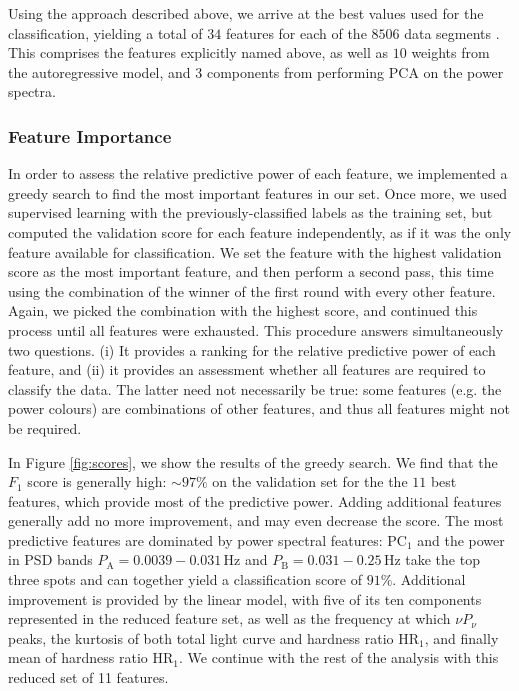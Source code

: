 \documentclass[12pt]{emulateapj}
\begin{document}
Using the approach described above, we arrive at the best values used for the classification, yielding a total of $34$ features for each of the $8506$ data segments . This comprises the features explicitly named above, as well as $10$ weights from the autoregressive model, and $3$ components from performing PCA on the power spectra.

\subsubsection{Feature Importance}

In order to assess the relative predictive power of each feature, we implemented a greedy search to find the most important features in our set. 
Once more, we used supervised learning with the previously-classified labels as the training set, but computed the validation score for each feature independently, as if it was the only feature available for classification. We set the feature with the highest validation score as the most important feature, and then perform a second pass, this time using the combination of the winner of the first round with every other feature. Again, we picked the combination with the highest score, and continued this process until all features were exhausted. This procedure answers simultaneously two questions. (i) It provides a ranking for the relative predictive power of each feature, and (ii) it provides an assessment whether all features are required to classify the data. The latter need not necessarily be true: some features (e.g. the power colours) are combinations of other features, and thus all features might not be required.

In Figure \ref{fig:scores}, we show the results of the greedy search. We find that the $F_1$ score is generally high: $\sim\!\! 97\%$ on the validation set for the the $11$ best features, which provide most of the predictive power. Adding additional features generally add no more improvement, and may even decrease the score. The most predictive features are dominated by power spectral features: $\mathrm{PC}_1$ and the power in PSD bands  $P_\mathrm{A} = 0.0039-0.031 \,\mathrm{Hz}$ and $P_\mathrm{B} = 0.031-0.25 \,\mathrm{Hz}$ take the top three spots and can together yield a classification score of $91\%$. Additional improvement is provided by the linear model, with five of its ten components represented in the reduced feature set, as well as the frequency at which $\nu P_\nu$ peaks, the kurtosis of both total light curve and hardness ratio $\mathrm{HR}_1$, and finally mean of hardness ratio $\mathrm{HR}_1$. We continue with the rest of the analysis with this reduced set of 11 features.
\end{document}
